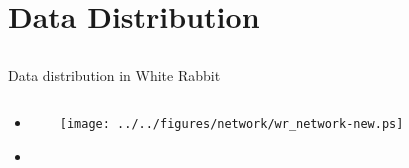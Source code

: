 \documentclass[compress,red]{beamer}
\begin{document}
\section{Data Distribution}
\subsection{}
\begin{frame}{Data distribution in White Rabbit}


\begin{columns}[c]
 
  \begin{itemize}
    \item \color{gray}{High accuracy/precision synchronization}
    \item \textbf{\color{red}{Deterministic, reliable and low-latency Control Data delivery}}
  \end{itemize}

    \begin{center}
    \texttt{[image: ../../figures/network/wr\_network-new.ps]}
    \end{center}
\end{columns}

\end{frame}
\end{document}
